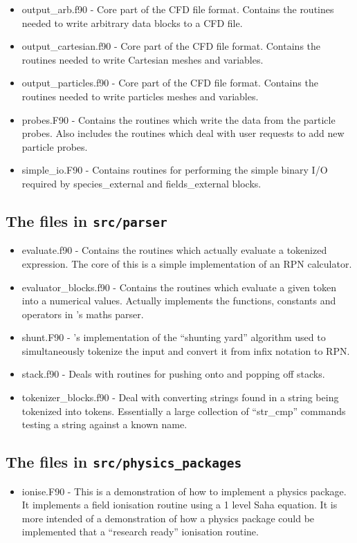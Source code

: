 \documentclass[12pt,a4paper]{article}
\newcommand{\inlinecode}[1]{{\color{warwickred} \bf\texttt{#1}}}
\newcommand{\EPOCH}{{\color{warwickdark}\fontfamily{phv}\selectfont{EPOCH}}}
\begin{document}
\begin{itemize}
\item output\_arb.f90 - Core part of the CFD file format. Contains the
  routines needed to write arbitrary data blocks to a CFD file.
\item output\_cartesian.f90 - Core part of the CFD file format. Contains the
  routines needed to write Cartesian meshes and variables.
\item output\_particles.f90 - Core part of the CFD file format. Contains the
  routines needed to write particles meshes and variables.
\item probes.F90 - Contains the routines which write the data from the
  particle probes. Also includes the routines which deal with user requests to
  add new particle probes.
\item simple\_io.F90 - Contains routines for performing the simple binary I/O
  required by species\_external and fields\_external blocks.
\end{itemize}

\subsection{The files in \inlinecode{src/parser}}
\begin{itemize}
\item evaluate.f90 - Contains the routines which actually evaluate a tokenized
  expression. The core of this is a simple implementation of an RPN
  calculator.
\item evaluator\_blocks.f90 - Contains the routines which evaluate a given
  token into a numerical values. Actually implements the functions, constants
  and operators in {\EPOCH}'s maths parser.
\item shunt.F90 - {\EPOCH}'s implementation of the ``shunting yard'' algorithm
  used to simultaneously tokenize the input and convert it from infix notation
  to RPN.
\item stack.f90 - Deals with routines for pushing onto and popping off
  stacks.
\item tokenizer\_blocks.f90 - Deal with converting strings found in a string
  being tokenized into tokens. Essentially a large collection of ``str\_cmp''
  commands testing a string against a known name.
\end{itemize}

\subsection{The files in \inlinecode{src/physics\_packages}}
\begin{itemize}
\item ionise.F90 - This is a demonstration of how to implement a physics
  package. It implements a field ionisation routine using a 1 level Saha
  equation. It is more intended of a demonstration of how a physics package
  could be implemented that a ``research ready'' ionisation routine.
\end{itemize}
\end{document}

